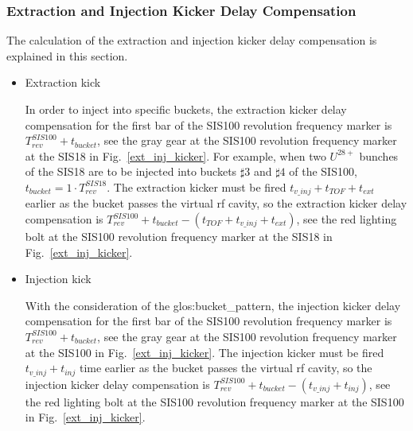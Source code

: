 \subsubsection{Extraction and Injection Kicker Delay Compensation}
The calculation of the extraction and injection kicker delay compensation is explained in this section.

\begin{itemize}
\item Extraction kick

In order to inject into specific buckets, the extraction kicker delay compensation for the first bar of the SIS100 revolution frequency marker is $T_{\mathit{rev}}^{\mathit{SIS100}} + t_{\mathit{bucket}}$, see the gray gear at the SIS100 revolution frequency marker at the SIS18 in Fig.~\ref{ext_inj_kicker}. For example, when two $U^{28+}$ bunches of the SIS18 are to be injected into buckets $\sharp3$ and $\sharp4$ of the SIS100, $t_{\mathit{bucket}} =1 \cdot T_{\mathit{rev}}^{\mathit{SIS18}}$. The extraction kicker must be fired $t_{\mathit{v\_inj}}+t_{\mathit{TOF}}+t_{\mathit{ext}}$ earlier as the bucket passes the virtual rf cavity, so the extraction kicker delay compensation is $T_{\mathit{rev}}^{\mathit{SIS100}} + t_{\mathit{bucket}} - (t_{\mathit{TOF}} + t_{\mathit{v\_inj}} + t_{\mathit{ext}})$, see the red lighting bolt at the SIS100 revolution frequency marker at the SIS18 in Fig.~\ref{ext_inj_kicker}. 

\item Injection kick

With the consideration of the \gls{glos:bucket_pattern}, the injection kicker delay compensation for the first bar of the SIS100 revolution frequency marker is $T_{\mathit{rev}}^{\mathit{SIS100}} + t_{\mathit{bucket}}$, see the gray gear at the SIS100 revolution frequency marker at the SIS100 in Fig.~\ref{ext_inj_kicker}. The injection kicker must be fired $t_{\mathit{v\_inj}}+t_{\mathit{inj}}$ time earlier as the bucket passes the virtual rf cavity, so the injection kicker delay compensation is $T_{\mathit{rev}}^{\mathit{SIS100}} + t_{\mathit{bucket}} - (t_{\mathit{v\_inj}} + t_{\mathit{inj}})$, see the red lighting bolt at the SIS100 revolution frequency marker at the SIS100 in Fig.~\ref{ext_inj_kicker}.
\end{itemize}


